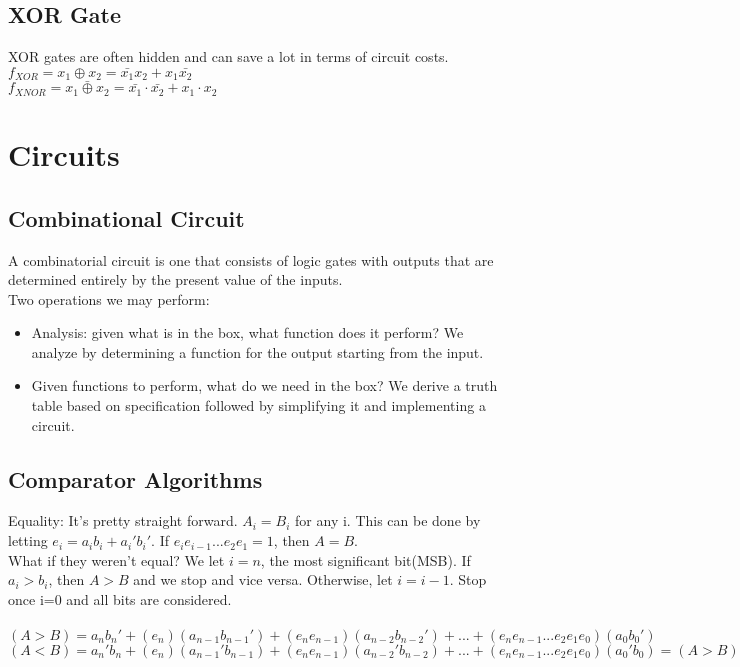 \documentclass[12pt]{report}
\begin{document}
	\section{XOR Gate}
		XOR gates are often hidden and can save a lot in terms of circuit costs.\\
		$f_{XOR} = x_1 \oplus x_2 = \bar{x_1}x_2 + x_1\bar{x_2}$\\
		$f_{XNOR} = \bar{x_1 \oplus x_2} = \bar{x_1} \cdot \bar{x_2} + x_1 \cdot x_2$
\chapter{Circuits}
	\section{Combinational Circuit}
		A combinatorial circuit is one that consists of logic gates with outputs that are determined entirely by the present value of the inputs.\\
		Two operations we may perform:\\
		\begin{itemize}
			\item Analysis: given what is in the box, what function does it perform? We analyze by determining a function for the output starting from the input.
			\item Given functions to perform, what do we need in the box? We derive a truth table based on specification followed by simplifying it and implementing a circuit.
		\end{itemize}
	\section{Comparator Algorithms}
		Equality: It's pretty straight forward. $A_i = B_i$ for any i. This can be done by letting $e_i = a_ib_i + a_i'b_i'$. If $e_ie_{i-1}...e_2e_1 = 1$, then $A = B$.\\
		What if they weren't equal? We let $i=n$, the most significant bit(MSB). If $a_i > b_i$, then $A>B$ and we stop and vice versa. Otherwise, let $i = i-1$. Stop once i=0 and all bits are considered.\\
		\\
		$(A > B) = a_nb_n' + (e_n)(a_{n-1}b_{n-1}') + (e_ne_{n-1})(a_{n-2}b_{n-2}')+ ... + (e_ne_{n-1}...e_2e_1e_0)(a_0b_0')$\\
		$(A < B) = a_n'b_n + (e_n)(a_{n-1}'b_{n-1}) + (e_ne_{n-1})(a_{n-2}'b_{n-2})+ ... + (e_ne_{n-1}...e_2e_1e_0)(a_0'b_0) = (A > B)'$\\
\end{document}
